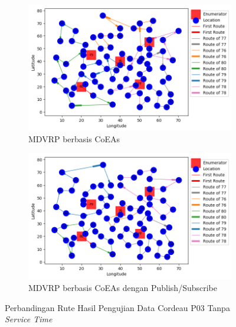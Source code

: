 \begin{figure}[!]
	\centering
	\begin{subfigure}[t]{\textwidth}
		\centering
		\includegraphics[width=\textwidth]{Resources/Images/test_result_cordeau_p03_notw_coes}
		\caption{MDVRP berbasis CoEAs}
		\label{fig:test_result_cordeau_p03_notw_coes}
	\end{subfigure}%
	
	\begin{subfigure}[t]{\textwidth}
		\centering
		\includegraphics[width=\textwidth]{Resources/Images/test_result_cordeau_p03_notw_pubsub_coes}
		\caption{MDVRP berbasis CoEAs dengan Publish/Subscribe}
		\label{fig:test_result_cordeau_p03_notw_pubsub_coes}
	\end{subfigure}
	\caption{Perbandingan Rute Hasil Pengujian Data Cordeau P03 Tanpa \textit{Service Time}}
	\label{fig:test_result_cordeau_p03_notw}
\end{figure}


